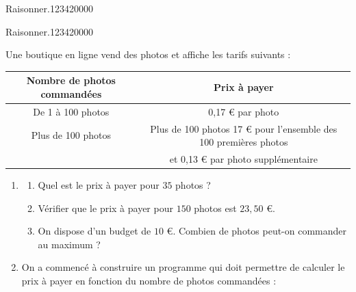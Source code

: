 \begin{pageAuto} 


\begin{ExoAuto}{Raisonner.}{1234}{2}{0}{0}{0}{0}

  

\end{ExoAuto}



 
\begin{ExoAuto}{Raisonner.}{1234}{2}{0}{0}{0}{0}

 Une boutique en ligne vend des photos et affiche les tarifs suivants :

 \begin{tabular}{|c|c|}
 \hline 
 Nombre de photos commandées & Prix à payer \\ 
 \hline 
De 1 à 100 photos & 0,17 \euro{} par photo \\ 
 \hline 
Plus de 100 photos & Plus de 100 photos 17 \euro{} pour l’ensemble des 100 premières photos
\\  
  & et 0,13 \euro{} par photo supplémentaire  \\ 
 \hline 
 \end{tabular} 

\begin{enumerate}
\item 

\begin{enumerate}
\item Quel est le prix à payer pour $35$ photos ?
\item  Vérifier que le prix à payer pour $150$ photos est $23,50$ \euro{}. 
\item  On dispose d'un budget de $10$ \euro{}. Combien de photos peut-on commander au maximum ? 
\end{enumerate}

\item  On a commencé à construire un programme qui doit permettre de calculer le prix à payer en
fonction du nombre de photos commandées :


\end{enumerate}
\end{ExoAuto}
\end{pageAuto}
